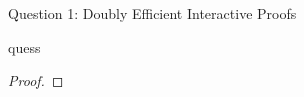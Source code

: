 \begin{solution}{Question 1: Doubly Efficient Interactive Proofs}\label{ques:1}
    \begin{question}
    quess
    \end{question}
    \tcblower{}
    \begin{proof}
    \end{proof}
\end{solution}
